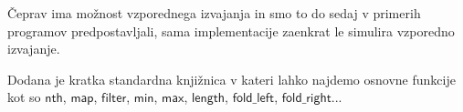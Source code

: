 Čeprav ima \aeff{} možnost vzporednega izvajanja in smo to do sedaj v primerih programov predpostavljali, sama implementacije zaenkrat le simulira vzporedno izvajanje.

Dodana je kratka standardna knjižnica v kateri lahko najdemo osnovne funkcije kot so $\mathsf{nth}$, $\mathsf{map}$, $\mathsf{filter}$, $\mathsf{min}$, $\mathsf{max}$, $\mathsf{length}$, $\mathsf{fold\_left}$, $\mathsf{fold\_right}$...